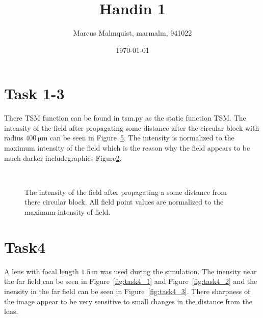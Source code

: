 \documentclass[12pt,a4paper]{article}
\title{Handin 1}
\author{Marcus Malmquist, marmalm, 941022}
\date{\today}
\begin{document}
\maketitle

\section{Task 1-3}\label{sec:1}
There TSM function can be found in tsm.py as the static function TSM. The intensity of the field after propagating some distance after the circular block with radius $\SI{400}{\micro\metre}$ can be seen in Figure~\ref{fig:task1}. The intensity is normalized to the maximum intensity of the field which is the reason why the field appears to be much darker includegraphics Figure\ref{fig:task1_2}.
\begin{figure}
  \centering
    \begin{subfigure}[b]{0.49\textwidth}
        \noindent\makebox[\textwidth]{\scalebox{0.40}{}}
        \label{fig:task1_1}
    \end{subfigure}  
    \begin{subfigure}[b]{0.49\textwidth}
        \noindent\makebox[\textwidth]{\scalebox{0.40}{}}
        \label{fig:task1_2}
    \end{subfigure}\\
    \begin{subfigure}[b]{0.49\textwidth}
        \noindent\makebox[\textwidth]{\scalebox{0.40}{}}
        \label{fig:task1_3}
    \end{subfigure}
    \begin{subfigure}[b]{0.49\textwidth}
        \noindent\makebox[\textwidth]{\scalebox{0.40}{}}
        \label{fig:task1_4}
    \end{subfigure}
  
  \caption{The intensity of the field after propagating a some distance from there circular block. All field point values are normalized to the maximum intensity of field.}
  \label{fig:task1}
\end{figure}

\section{Task4}\label{sec:4}
A lens with focal length $\SI{1.5}{\metre}$ was used during the simulation. The inensity near the far field can be seen in Figure~\ref{fig:task4_1} and Figure~\ref{fig:task4_2} and the inensity in the far field can be seen in Figure~\ref{fig:task4_3}. There sharpness of the image appear to be very sensitive to small changes in the distance from the lens.
\end{document}
